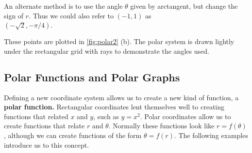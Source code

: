 \begin{example}
\begin{enumerate}
\begin{enumerate}
		An alternate method is to use the angle $\theta$ given by arctangent, but change the sign of $r$. Thus we could also refer to $(-1,1)$ as\\ $(-\sqrt{2},-\pi/4)$.
	\end{enumerate}
These points are plotted in \autoref{fig:polar2} (b). The polar system is drawn lightly under the rectangular grid with rays to demonstrate the angles used.
\end{enumerate}
\end{example}

\subsection{Polar Functions and Polar Graphs}

Defining a new coordinate system allows us to create a new kind of function, a \textbf{polar function.} Rectangular coordinates lent themselves well to creating functions that related $x$ and $y$, such as $y=x^2.$ Polar coordinates allow us to create functions that relate $r$ and $\theta$. Normally these functions look like $r=f(\theta)$, although we can create functions of the form $\theta = f(r)$. The following examples introduce us to this concept.


